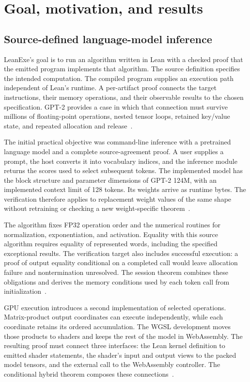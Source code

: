 \section{Goal, motivation, and results}
\label{sec:context}

\subsection{Source-defined language-model inference}

LeanExe's goal is to run an algorithm written in Lean with a checked proof that the emitted program implements that algorithm.  The source definition specifies the intended computation.  The compiled program supplies an execution path independent of Lean's runtime.  A per-artifact proof connects the target instructions, their memory operations, and their observable results to the chosen specification.  GPT-2 provides a case in which that connection must survive millions of floating-point operations, nested tensor loops, retained key/value state, and repeated allocation and release~\cite{subset,cached,entry}.

The initial practical objective was command-line inference with a pretrained language model and a complete source-agreement proof.  A user supplies a prompt, the host converts it into vocabulary indices, and the inference module returns the scores used to select subsequent tokens.  The implemented model has the block structure and parameter dimensions of GPT-2 124M, with an implemented context limit of 128 tokens.  Its weights arrive as runtime bytes.  The verification therefore applies to replacement weight values of the same shape without retraining or checking a new weight-specific theorem~\cite{manifest,guide,session}.

The algorithm fixes FP32 operation order and the numerical routines for normalization, exponentiation, and activation.  Equality with this source algorithm requires equality of represented words, including the specified exceptional results.  The verification target also includes successful execution: a proof of output equality conditional on a completed call would leave allocation failure and nontermination unresolved.  The session theorem combines these obligations and derives the memory conditions used by each token call from initialization~\cite{entry,session,budget}.

GPU execution introduces a second implementation of selected operations.  Matrix-product output coordinates can execute independently, while each coordinate retains its ordered accumulation.  The WGSL development moves those products to shaders and keeps the rest of the model in WebAssembly.  The resulting proof must connect three interfaces: the Lean kernel definition to emitted shader statements, the shader's input and output views to the packed model tensors, and the external call to the WebAssembly controller.  The conditional hybrid theorem composes these connections~\cite{wg-plan,wg-packedsource,wg-backend}.

